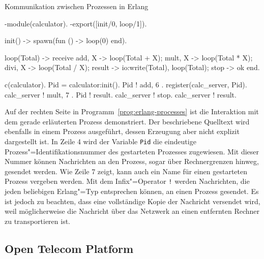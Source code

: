\begin{program}[!hbt]
\caption{Kommunikation zwischen Prozessen in Erlang}
\label{prog:erlang-processes}
\noindent\begin{minipage}[t]{.52\textwidth}
\lstset{showlines=true}
\begin{ErlangCode}
-module(calculator).
-export([init/0, loop/1]).

init() ->
  spawn(fun () -> loop(0) end).

loop(Total) ->
  receive
    { add,  X } -> loop(Total + X);
    { mult, X } -> loop(Total * X);
		{ divi, X } -> loop(Total / X);
    result      -> io:write(Total),
									 loop(Total);
    stop    		-> ok
  end.
\end{ErlangCode}

\end{minipage}\hfill
\begin{minipage}[t]{.44\textwidth}
\lstset{showlines=true}
\begin{ErlangCode}
c(calculator).
Pid = calculator:init().
Pid ! { add, 6 }.
register(calc_server, Pid).
calc_server ! { mult, 7 }.
Pid ! result. %
calc_server ! stop.
calc_server ! result.
\end{ErlangCode}

\end{minipage}
\end{program}

Auf der rechten Seite in Programm~\ref{prog:erlang-processes} ist die Interaktion mit dem gerade erläuterten Prozess demonstriert. Der beschriebene Quelltext wird ebenfalls in einem Prozess ausgeführt, dessen Erzeugung aber nicht explizit dargestellt ist. In Zeile 4 wird der Variable \lstinline{Pid} die eindeutige Prozess"=Identifikationsnummer des gestarteten Prozesses zugewiesen. Mit dieser Nummer können Nachrichten an den Prozess, sogar über Rechnergrenzen hinweg, gesendet werden. Wie Zeile 7 zeigt, kann auch ein Name für einen gestarteten Prozess vergeben werden. Mit dem Infix"=Operator \lstinline{!} werden Nachrichten, die jeden beliebigen Erlang"=Typ entsprechen können, an einen Prozess gesendet. Es ist jedoch zu beachten, dass eine vollständige Kopie der Nachricht versendet wird, weil möglicherweise die Nachricht  über das Netzwerk an einen entfernten Rechner zu transportieren ist.

\subsection{Open Telecom Platform}

